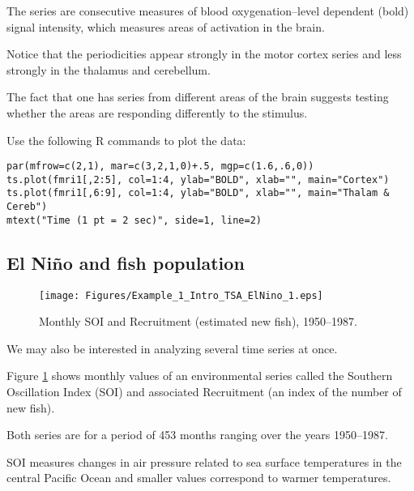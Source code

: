 \documentclass[
paper=128mm:96mm, %
fontsize=9.5pt, %
pagesize, %
parskip=half-, %
]{scrartcl} %
\theoremstyle{mythmstyle} %
\begin{document}
The series are consecutive measures of blood oxygenation--level dependent (bold) signal intensity, which measures areas of activation in the brain. 

Notice that the periodicities appear strongly in the motor cortex series and less strongly in the thalamus and cerebellum. 

The fact that one has series from different areas of the brain suggests testing whether the areas are responding differently to the stimulus. 
\clearpage


Use the following R commands to plot the data:
%
\begin{lstlisting}[belowskip=-0.8 \baselineskip]
par(mfrow=c(2,1), mar=c(3,2,1,0)+.5, mgp=c(1.6,.6,0))
ts.plot(fmri1[,2:5], col=1:4, ylab="BOLD", xlab="", main="Cortex")
ts.plot(fmri1[,6:9], col=1:4, ylab="BOLD", xlab="", main="Thalam & Cereb")
mtext("Time (1 pt = 2 sec)", side=1, line=2)
\end{lstlisting}
\clearpage

%
\subsection{El Ni\~no and fish population}
\begin{figure}[!h]
\begin{center}
%
\texttt{[image: Figures/Example\_1\_Intro\_TSA\_ElNino\_1.eps]}
%
\caption{\footnotesize{Monthly SOI and Recruitment (estimated new fish), 1950--1987.}}
%
\label{fig:elnino_fish}
%
\end{center}
\end{figure}
%
\clearpage


We may also be interested in analyzing several time series at once. 

Figure \ref{fig:elnino_fish} shows monthly values of an environmental series called the Southern Oscillation Index (SOI) and associated Recruitment (an index of the number of new fish). 

Both series are for a period of 453 months ranging over the years 1950--1987. 

SOI measures changes in air pressure related to sea surface temperatures in the central Pacific Ocean and smaller values correspond to warmer temperatures. 
\end{document}
